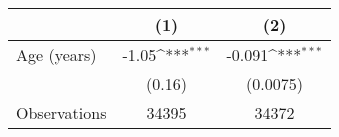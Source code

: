 {
\def\sym#1{\ifmmode^{#1}\else\(^{#1}\)\fi}
\begin{tabular}{l*{2}{c}}
\toprule
                &\multicolumn{1}{c}{(1)}         &\multicolumn{1}{c}{(2)}         \\
\midrule
Age (years)     &    -1.05\sym{***}&   -0.091\sym{***}\\
                &   (0.16)         & (0.0075)         \\
\midrule
Observations    &    34395         &    34372         \\
\bottomrule
\end{tabular}
}
